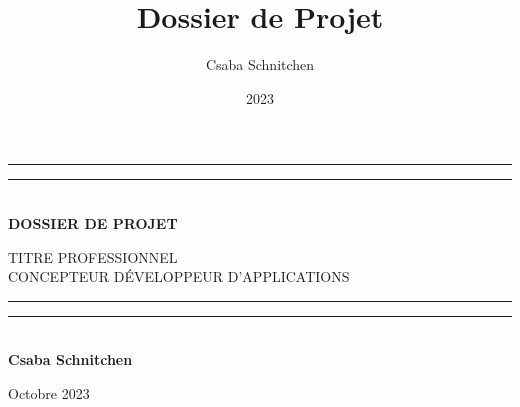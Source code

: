 \documentclass[12pt]{report}
\title{Dossier de Projet}
\author{Csaba Schnitchen}
\date{2023}
\begin{document}
\begin{titlepage}
    \centering
    \vspace*{3cm}

    \rule{\textwidth}{1.6pt}\vspace*{-\baselineskip}\vspace*{2pt}
    \rule{\textwidth}{0.4pt}\\[\baselineskip]

    \Huge
    \textbf{DOSSIER DE PROJET}

    \vspace{0.5cm}
    \LARGE
    TITRE PROFESSIONNEL \\ CONCEPTEUR DÉVELOPPEUR D'APPLICATIONS

    \rule{\textwidth}{0.4pt}\vspace*{-\baselineskip}\vspace{3.2pt}
    \rule{\textwidth}{1.6pt}\\[\baselineskip]

    \vspace{1.5cm}
    \textbf{Csaba Schnitchen}

    \vfill

    Octobre 2023
\end{titlepage}
\tableofcontents
\newpage














\end{document}
